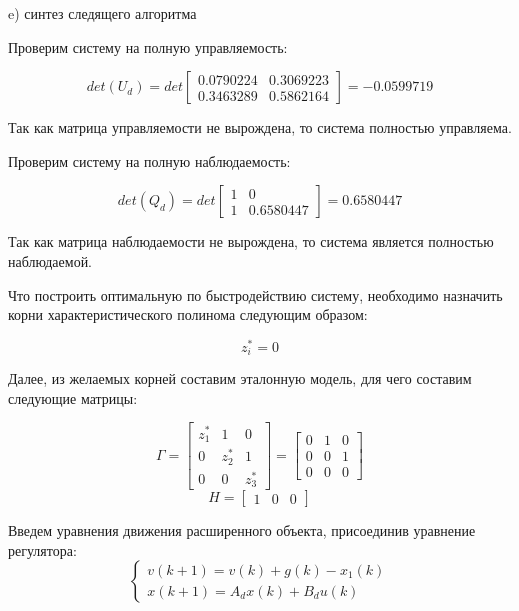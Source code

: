 \documentclass[a4paper,14pt]{extreport}
\begin{document}
e) синтез следящего алгоритма

Проверим систему на полную управляемость:

\begin{equation}
	det(U_d) = det
	\begin{bmatrix}
	0.0790224 &   0.3069223\\  
	0.3463289  &  0.5862164 
	\end{bmatrix}
	=
	 - 0.0599719 
\end{equation}

Так как матрица управляемости не вырождена, то система полностью управляема.

Проверим систему на полную наблюдаемость:

\begin{equation}
det(Q_d) = det
\begin{bmatrix}
1&    0\\         
1  &  0.6580447 
\end{bmatrix}
=
0.6580447  
\end{equation}

Так как матрица наблюдаемости не вырождена, то система является полностью наблюдаемой.

Что построить оптимальную по быстродействию систему, необходимо назначить корни характеристического полинома следующим образом:

\begin{equation}
	z_i^* = 0
\end{equation}

Далее, из желаемых корней составим эталонную модель, для чего составим следующие матрицы:

\begin{equation}
\Gamma = 
\begin{bmatrix}
z^*_1 & 1 & 0\\
0 & z^*_2 & 1\\
0 & 0 & z^*_3
\end{bmatrix}
=
\begin{bmatrix}
0&1&0\\
0&0&1\\
0&0&0
\end{bmatrix}
\end{equation}
\begin{equation}
	H =
	\begin{bmatrix}
	1&0&0
	\end{bmatrix}
\end{equation}

Введем уравнения движения расширенного объекта, присоединив уравнение регулятора:
\begin{equation}
	\begin{cases}
	v(k+1) = v(k) + g(k) - x_1 (k)\\
	x(k+1) = A_d x(k) + B_d u(k)
	\end{cases}
\end{equation}
\end{document}
